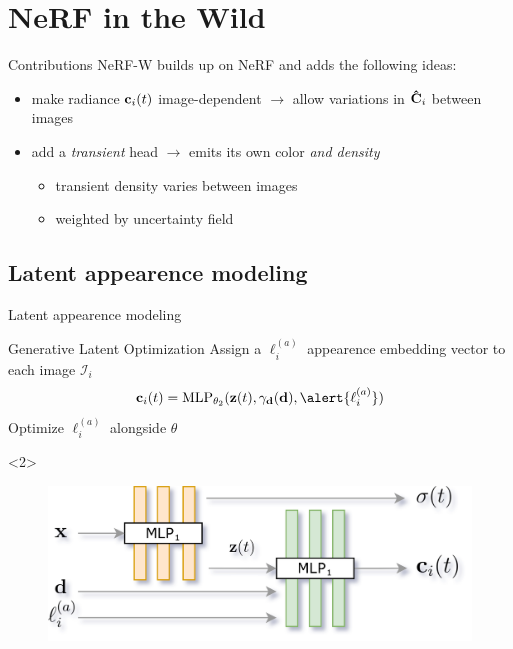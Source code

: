 \documentclass[aspectratio=1610,handout]{beamer}
\begin{document}
\section{NeRF in the Wild}
\begin{frame}{Contributions}
    NeRF-W builds up on NeRF and adds the following ideas:
    \bigskip
    \pause
    \begin{itemize}
        \item make radiance \(\vb{c}_i (t)\) image-dependent \(\rightarrow\) allow variations in \(\vb{\hat{C}}_i\) between images 
        \pause 
        \item add a \emph{transient} head \(\rightarrow\) emits its own color \emph{and density}
        \begin{itemize}
            \item transient density varies between images
            \item weighted by uncertainty field
        \end{itemize}
    \end{itemize}
\end{frame}

\subsection{Latent appearence modeling}
\begin{frame}{Latent appearence modeling}
    \begin{block}{Generative Latent Optimization}
        Assign a \(\ell_i^{(a)}\) 
        appearence embedding vector to each image \(\mathcal{I}_i\)
        \begin{equation*}
            \vb{c}_i(t) = \textrm{MLP}_{\theta_2} (\vb{z}(t), \gamma_{\vb{d}}(\vb{d}), \alert{\ell_i^{(a)}})
        \end{equation*}
        Optimize \(\ell_i^{(a)}\) alongside \(\theta\)
    \end{block}
    \begin{onlyenv}<2>
        \bigskip
        \begin{figure}[H]
            \centering
            \includegraphics[width=.65\textwidth,keepaspectratio]{nerfa-architecture.png}
        \end{figure}
    \end{onlyenv}
\end{frame}
\end{document}
